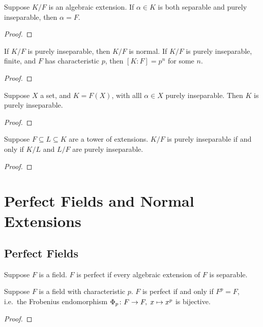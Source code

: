 \begin{theorem}
    Suppose \(K/F\) is an algebraic extension.
    If \(\alpha \in K\) is both separable and purely inseparable,
    then \(\alpha = F\).
\end{theorem}
\begin{proof}
\end{proof}
\begin{theorem}
    If \(K/F\) is purely inseparable, then \(K/F\) is normal.
    If \(K/F\) is purely inseparable, finite, and \(F\) has characteristic \(p\),
    then \([K:F] = p^n\) for some \(n\).
\end{theorem}
\begin{proof}
\end{proof}
\begin{theorem}
    Suppose \(X\) a set, and \(K = F(X)\),
    with alll \(\alpha \in X\) purely inseparable.
    Then \(K\) is purely inseparable.
\end{theorem}
\begin{proof}
\end{proof}
\begin{theorem}
    Suppose \(F \subseteq L \subseteq K\) are a tower of extensions.
    \(K/F\) is purely inseparable if and only if
    \(K/L\) and \(L/F\) are purely inseparable.
\end{theorem}
\begin{proof}
\end{proof}



\section{Perfect Fields and Normal Extensions}

\subsection*{Perfect Fields}

\begin{definition}
    Suppose \(F\) is a field.
    \(F\) is perfect if every algebraic extension of \(F\) is separable.
\end{definition}
\begin{proposition}
    Suppose \(F\) is a field with characteristic \(p\).
    \(F\) is perfect if and only if \(F^p = F\),
    i.e.\ the Frobenius endomorphism \(\Phi_p\colon F\to F,\;x\mapsto x^p\) is bijective.
\end{proposition}
\begin{proof}
\end{proof}

